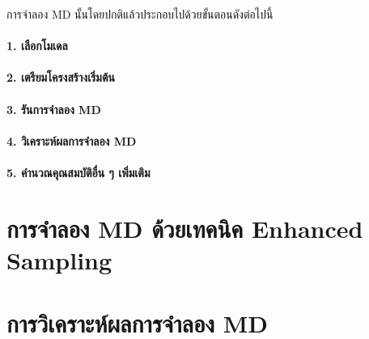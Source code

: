 การจำลอง MD นั้นโดยปกติแล้วประกอบไปด้วยขั้นตอนดังต่อไปนี้

\paragraph{1. เลือกโมเดล}

\paragraph{2. เตรียมโครงสร้างเริ่มต้น}

\paragraph{3. รันการจำลอง MD}

\paragraph{4. วิเคราะห์ผลการจำลอง MD}

\paragraph{5. คำนวณคุณสมบัติอื่น ๆ เพิ่มเติม}

\section{การจำลอง MD ด้วยเทคนิค Enhanced Sampling}

\section{การวิเคราะห์ผลการจำลอง MD}

